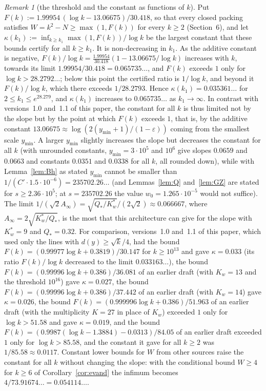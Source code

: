 \documentclass[11pt]{amsart}
\theoremstyle{definition}
\theoremstyle{remark}
\newtheorem{remark}[theorem]{Remark}
\begin{document}
\begin{remark}[the threshold and the constant as functions of $k$]\label{rem:k}
Put $F(k):=1.99954\,(\log k-13.06675)/30.418$, so that every closed packing satisfies $W=k^2-N\ge\max(1,F(k))$ for every
$k\ge2$ (Section~6), and let $\kappa(k_1):=\inf_{k\ge k_1}\max(1,F(k))/\log k$ be the largest constant that these bounds certify for
all $k\ge k_1$. It is non-decreasing in $k_1$. As the additive constant is negative, $F(k)/\log k=\frac{1.99954}{30.418}(1-13.06675/\log k)$
increases with $k$, towards its limit $1.99954/30.418=0.065735\ldots$, and $F(k)$ exceeds $1$ only for $\log k>28.2792\ldots$; below this
point the certified ratio is $1/\log k$, and beyond it $F(k)/\log k$, which there exceeds $1/28.2793$. Hence
$\kappa(k_1)=0.035361\ldots$ for $2\le k_1\le e^{28.279}$, and $\kappa(k_1)$ increases to $0.065735\ldots$ as $k_1\to\infty$. In contrast
with versions~1.0 and~1.1 of this paper, the constant for all $k$ is thus limited not by the slope but by the point at which $F(k)$ exceeds
$1$, that is, by the additive constant $13.06675\approx\log(2(y_{\min}+1)/(1-\varepsilon))$ coming from the smallest scale $y_{\min}$. A larger
$y_{\min}$ slightly increases the slope but decreases the constant for all $k$ (with unrounded constants, $y_{\min}=3\cdot10^5$ and $10^6$
give slopes $0.0659$ and $0.0663$ and constants $0.0351$ and $0.0338$ for all $k$, all rounded down), while with Lemma~\ref{lem:Bh} as stated $y_{\min}$
cannot be smaller than $1/(C'\cdot1.5\cdot10^{-6})=235702.26\ldots$ (and Lemmas~\ref{lem:Q} and~\ref{lem:GZ} are stated for $s\ge2.36\cdot10^5$;
at $s=235702.26$ the value $w_0=1.265\cdot10^{-5}$ would not suffice). The limit $1/(\sqrt2A_\infty)=\sqrt{Q_*/K_w^*}/(2\sqrt2)\approx0.066667$,
where $A_\infty=2\sqrt{K_w^*/Q_*}$, is the most that this architecture can give for the slope with $K_w^*=9$ and $Q_*=0.32$. For
comparison, versions~1.0 and~1.1 of this paper, which used only the lines with $d(y)\ge\sqrt k/4$, had the bound
$F(k)=(0.99977\log k+0.3819)/30.147$ for $k\ge10^{13}$ and gave $\kappa=0.033$ (its ratio $F(k)/\log k$ decreased to the limit
$0.033163\ldots$), the bound $F(k)=(0.99996\log k+0.386)/36.081$ of an
earlier draft (with $K_w=13$ and the threshold $10^{16}$) gave $\kappa=0.027$, the bound $F(k)=(0.99996\log k+0.386)/37.442$ of an earlier draft
(with $K_w=14$) gave $\kappa=0.026$, the bound
$F(k)=(0.999996\log k+0.386)/51.963$ of an earlier draft (with the multiplicity $K=27$ in place of $K_w$) exceeded $1$ only for
$\log k>51.58$ and gave $\kappa=0.019$, and the bound $F(k)=(0.9987(\log k-1.3884)-0.0313)/84.05$ of an earlier draft exceeded $1$ only
for $\log k>85.58$, and the constant it gave for all $k\ge2$ was $1/85.58\approx0.0117$. Constant lower bounds for $W$ from other sources
raise the constant for all $k$ without changing the slope: with the conditional bound $W\ge4$ for $k\ge6$ of Corollary~\ref{cor:evand}
the infimum becomes
$4/73.91674\ldots=0.054114\ldots$.
\end{remark}
\end{document}
